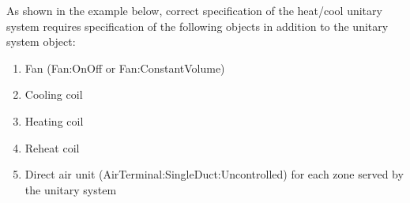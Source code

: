 As shown in the example below, correct specification of the heat/cool unitary system requires specification of the following objects in addition to the unitary system object:

\begin{enumerate}
\def\labelenumi{\arabic{enumi})}
\item
  Fan (Fan:OnOff or Fan:ConstantVolume)
\item
  Cooling coil
\item
  Heating coil
\item
  Reheat coil
\item
  Direct air unit (AirTerminal:SingleDuct:Uncontrolled) for each zone served by the unitary system
\end{enumerate}

\begin{lstlisting}


\end{lstlisting}
